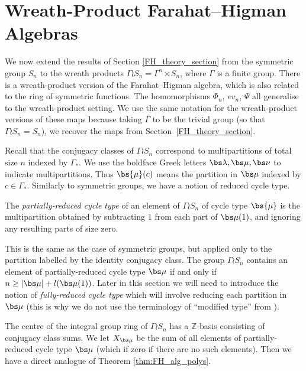 \section{Wreath-Product Farahat--Higman Algebras} \label{rgamma_section}

We now extend the results of Section \ref{FH_theory_section} from the symmetric group $S_n$ to the wreath products $\Gamma \wr S_n = \Gamma ^n \rtimes S_n$, where $\Gamma$ is a finite group. There is a wreath-product version of the Farahat--Higman algebra, which is also related to the ring of symmetric functions. The homomorphisms $\Phi_n$, $ev_n$, $\Psi$ all generalise to the wreath-product setting. We use the same notation for the wreath-product versions of these maps because taking $\Gamma$ to be the trivial group (so that $\Gamma \wr S_n = S_n$), we recover the maps from Section~\ref{FH_theory_section}.

Recall that the conjugacy classes of $\Gamma \wr S_n$ correspond to multipartitions of total size $n$ indexed by $\Gamma_*$. We use the boldface Greek letters $\bs \lambda, \bs \mu, \bs \nu$ to indicate multipartitions. Thus $\bs{\mu}(c)$ means the partition in $\bs \mu$ indexed by $c \in \Gamma_*$. Similarly to symmetric groups, we have a notion of reduced cycle type. 
\begin{definition}
The \emph{partially-reduced cycle type} of an element of $\Gamma \wr S_n$ of cycle type $\bs{\mu}$ is the multipartition obtained by subtracting $1$ from each part of $\bs \mu(1)$, and ignoring any resulting parts of size zero. 
\end{definition}

This is the same as the case of symmetric groups, but applied only to the partition labelled by the identity conjugacy class. The group $\Gamma \wr S_n$ contains an element of partially-reduced cycle type $\bs \mu$ if and only if $n \geq |\bs \mu| + l(\bs \mu(1))$. Later in this section we will need to introduce the notion of \emph{fully-reduced cycle type} which will involve reducing each partition in $\bs \mu$ (this is why we do not use the terminology of ``modified type'' from \cite{Wang1}).

The centre of the integral group ring of $\Gamma \wr S_n$ has a $\mathbb{Z}$-basis consisting of conjugacy class sums. We let $X_{\bs \mu}$ be the sum of all elements of partially-reduced cycle type $\bs \mu$ (which if zero if there are no such elements). Then we have a direct analogue of Theorem \ref{thm:FH_alg_polys}.

